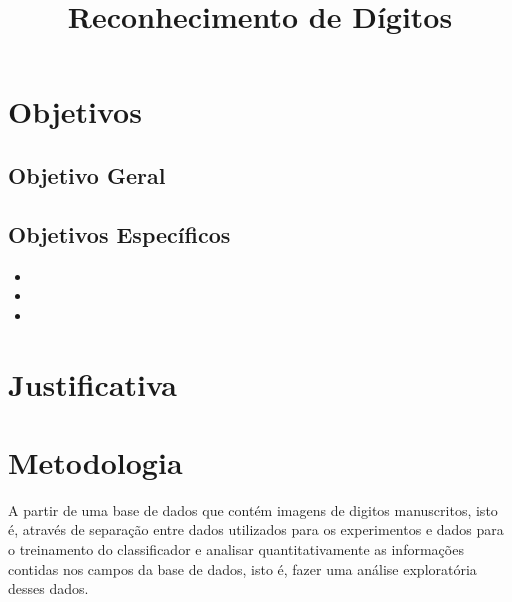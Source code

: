\documentclass[conference]{IEEEtran}
\begin{document}
\title{Reconhecimento de Dígitos}

\author{
\and
{}

}

\maketitle





\section{Objetivos}
\subsection{Objetivo Geral}

\subsection{Objetivos Específicos}
\begin{itemize}
\item 
\item 
\item 
\end{itemize}
\section{Justificativa}

\section{Metodologia}

A partir de uma base de dados que contém imagens de digitos manuscritos, isto é, através de separação entre dados utilizados para os experimentos e dados para o treinamento do classificador e analisar quantitativamente as informações contidas nos campos da base de dados, isto é, fazer uma análise exploratória desses dados. 
\end{document}
